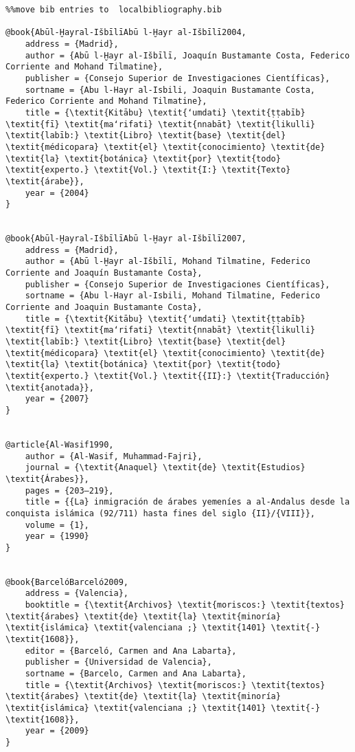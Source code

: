 \documentclass[output=paper,modfonts,nonflat]{langsci/langscibook}
\begin{document}
\begin{verbatim}%%move bib entries to  localbibliography.bib 

@book{Abūl-Ḫayral-IšbīlīAbū l-Ḫayr al-Išbīlī2004,
	address = {Madrid},
	author = {Abū l-Ḫayr al-Išbīlī, Joaquín Bustamante Costa, Federico Corriente and Mohand Tilmatine},
	publisher = {Consejo Superior de Investigaciones Científicas},
	sortname = {Abu l-Hayr al-Isbili, Joaquin Bustamante Costa, Federico Corriente and Mohand Tilmatine},
	title = {\textit{Kitābu} \textit{ʻumdati} \textit{ṭṭabīb} \textit{fī} \textit{maʻrifati} \textit{nnabāt} \textit{likulli} \textit{labīb:} \textit{Libro} \textit{base} \textit{del} \textit{médicopara} \textit{el} \textit{conocimiento} \textit{de} \textit{la} \textit{botánica} \textit{por} \textit{todo} \textit{experto.} \textit{Vol.} \textit{I:} \textit{Texto} \textit{árabe}},
	year = {2004}
}


@book{Abūl-Ḫayral-IšbīlīAbū l-Ḫayr al-Išbīlī2007,
	address = {Madrid},
	author = {Abū l-Ḫayr al-Išbīlī, Mohand Tilmatine, Federico Corriente and Joaquín Bustamante Costa},
	publisher = {Consejo Superior de Investigaciones Científicas},
	sortname = {Abu l-Hayr al-Isbili, Mohand Tilmatine, Federico Corriente and Joaquin Bustamante Costa},
	title = {\textit{Kitābu} \textit{ʻumdati} \textit{ṭṭabīb} \textit{fī} \textit{maʻrifati} \textit{nnabāt} \textit{likulli} \textit{labīb:} \textit{Libro} \textit{base} \textit{del} \textit{médicopara} \textit{el} \textit{conocimiento} \textit{de} \textit{la} \textit{botánica} \textit{por} \textit{todo} \textit{experto.} \textit{Vol.} \textit{{II}:} \textit{Traducción} \textit{anotada}},
	year = {2007}
}


@article{Al-Wasif1990,
	author = {Al-Wasif, Muhammad-Fajri},
	journal = {\textit{Anaquel} \textit{de} \textit{Estudios} \textit{Árabes}},
	pages = {203–219},
	title = {{La} inmigración de árabes yemeníes a al-Andalus desde la conquista islámica (92/711) hasta fines del siglo {II}/{VIII}},
	volume = {1},
	year = {1990}
}


@book{BarcelóBarceló2009,
	address = {Valencia},
	booktitle = {\textit{Archivos} \textit{moriscos:} \textit{textos} \textit{árabes} \textit{de} \textit{la} \textit{minoría} \textit{islámica} \textit{valenciana ;} \textit{1401} \textit{-} \textit{1608}},
	editor = {Barceló, Carmen and Ana Labarta},
	publisher = {Universidad de Valencia},
	sortname = {Barcelo, Carmen and Ana Labarta},
	title = {\textit{Archivos} \textit{moriscos:} \textit{textos} \textit{árabes} \textit{de} \textit{la} \textit{minoría} \textit{islámica} \textit{valenciana ;} \textit{1401} \textit{-} \textit{1608}},
	year = {2009}
}



\end{verbatim}
\end{document}
